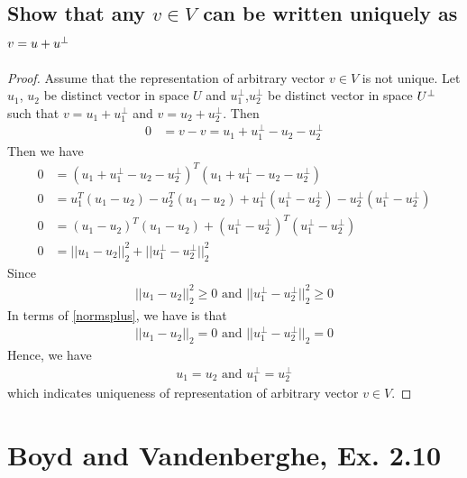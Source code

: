 \documentclass[11pt,a4paper]{article}
\begin{document}
\subsection{Show that any $v \in V$ can be written uniquely as $v = u + u^{\perp}$} 
\begin{proof}
    Assume that the representation of arbitrary vector $v \in V$ is not
    unique.
    Let $u_1$, $u_2$ be distinct vector in space $U$ and
    $u^{\perp}_1$,$u^{\perp}_2$ be distinct vector in space $U^{\perp}$ such that $v =
    u_1 + u^{\perp}_1$ and $v = u_2 + u^{\perp}_2$. 
    Then 
    \begin{align}
        0 &= v - v = u_1 + u^{\perp}_1 - u_2 - u^{\perp}_2 
    \end{align}
    Then we have
    \begin{align}
        0 &= (u_1 + u^{\perp}_1 - u_2 - u^{\perp}_2)^T(u_1 + u^{\perp}_1 - u_2 - u^{\perp}_2) \\
        0 &= u_1^T (u_1-u_2) - u_2^T (u_1-u_2) +
        u^{\perp}_1(u^{\perp}_1-u^{\perp}_2) - u^{\perp}_2(u^{\perp}_1-u^{\perp}_2) \\
        0 &= (u_1-u_2)^T(u_1-u_2) + (u^{\perp}_1-u^{\perp}_2)^T(u^{\perp}_1-u^{\perp}_2) \\
        0 &= || u_1-u_2 ||_2^2 + || u^{\perp}_1-u^{\perp}_2||_2^2
        \label{normsplus}
    \end{align}
    Since 
    \begin{align}
        || u_1-u_2 ||_2^2 \geq 0 \text{ and } ||u^{\perp}_1-u^{\perp}_2||_2^2 \geq 0 
    \end{align}
    In terms of \eqref{normsplus}, we have is that 
    \begin{align}
        || u_1-u_2 ||_2 = 0 \text { and } ||u^{\perp}_1-u^{\perp}_2||_2 = 0 
    \end{align}
    Hence, we have 
    \begin{align}
        u_1 = u_2 \text{ and } u^{\perp}_1 = u^{\perp}_2
    \end{align}
    which indicates uniqueness of representation of arbitrary vector $v \in V$.
\end{proof}

\newpage
\section{Boyd and Vandenberghe, Ex. 2.10}
\newcommand{\Snp}{\ensuremath{\mathbb{S}_{+}^{n}}}
\newcommand{\x}[1]{\ensuremath{\mathbf{x}_{#1}}}
\newcommand{\linear}[1]{\ensuremath{b^T #1}}
\newcommand{\quadratic}[1]{\ensuremath{#1^{T} A #1}}
\newcommand{\nsquadratic}[2]{\ensuremath{#1^{T} A #2}}
\newcommand{\quacombo}[1]{\ensuremath{\quadratic{#1} + \linear{#1} + c}}
\newcommand{\xcombo}{\ensuremath{\lambda \x{1} + (1-\lambda) \x{2}}}
\end{document}
